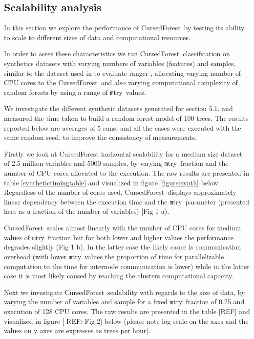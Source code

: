 \documentclass[10pt,letterpaper]{article}
\newcommand{\cursedforest}{{\sc CursedForest}}
\newcommand{\mtry}{{\texttt mtry}}
\begin{document}
\subsection{Scalability analysis}
In this section we explore the performance of \cursedforest\ by testing its ability to scale to different sizes of data
and computational resources.

In order to asses these characteristics we ran \cursedforest\ classification on synthetics datasets with varying numbers
of variables (features) and samples, similar to the dataset used in to evaluate ranger \cite{Wright.and.Ziegle.2016},
allocating varying number of CPU cores to the \cursedforest\ and also varying computational complexity of random forests
by using a range of \mtry\ values.


We investigate the different synthetic datasets generated for section 5.1. and measured the time taken to build a random
forest model of 100 trees. The results reported below are averages of 5 runs, and all the cases were executed with the
same random seed, to improve the consistency of measurements.

Firstly we look at CursedForest horizontal scalability for a medium size dataset of 2.5 million variables and 5000
samples, by varying \mtry\ fraction and the number of CPU cores allocated to the execution. The raw results are
presented in table \ref{synthetictimingtable} and visualized in figure \ref{figure:synth} below. Regardless of the
number of cores used, \cursedforest\ displays approximately linear dependency between the execution time and the \mtry\
parameter (presented here as a fraction of the number of variables) [Fig 1 a).

\cursedforest{}ales almost linearly with the number of CPU cores for medium values of \mtry\ fraction but for both
lower and higher values the performance degrades slightly (Fig 1 b). In the latter case the likely cause is
communication overhead (with lower \mtry\ values the proportion of time for parallelizable computation to the time for
internode communication is lower) while in the latter case it is most likely caused by reaching the clusters
computational capacity.

Next we investigate \cursedforest{}alability with regards to the size of data, by varying the number of variables and
sample for a fixed \mtry\ fraction of 0.25 and execution of 128 CPU cores. The raw results are presented in the table
[REF] and visualized in figure [ REF: Fig 2] below (please note log scale on the axes and the values on y axes are
expresses as trees per hour).
\end{document}
